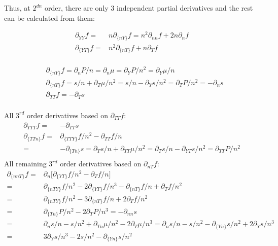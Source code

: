 \documentclass[11pt,letter]{article}
\begin{document}
Thus, at $2^{dn}$ order, there are only 3 independent partial derivatives and the rest can be calculated from them:
\begin{mdframed}
\begin{equation}
 \begin{split}
 \partial_{YY}f=&n\partial_{\{nY\}}f=n^2\partial_{nn}f+2n\partial_n f\\
  \partial_{\{YT\}}f=&n^2\partial_{\{nT\}}f+n\partial_{T}f\\
 \end{split}
\end{equation}
\end{mdframed}
\begin{mdframed}
\begin{equation}
 \begin{split}
  &\partial_{\{nY\}}f= \partial_n P/n = \partial_n \mu  = \partial_Y P /n^2 = \partial_Y \mu /n \\
  &\partial_{\{nT\}}f=s/n+\partial_T\mu/n^2=s/n-\partial_Ys/n^2=\partial_T P/n^2=-\partial_n s\\
  &\partial_{TT} f =-\partial_T s\\
 \end{split}
\end{equation}
\end{mdframed}
All $3^{rd}$ order derivatives based on $\partial_{TT}f$:
\begin{equation}
 \begin{split}
  \partial_{TTT}f=&-\partial_{TT}s\\
  \partial_{\{TTn\}}f=&\partial_{\{TTY\}}f/n^2-\partial_{TT}f/n\\
  =&-\partial_{\{Tn\}}s=\partial_Ts/n+\partial_{TT}\mu/n^2 = \partial_Ts/n-\partial_{YT}s/n^2=\partial_{TT}P/n^2\\ 
 \end{split}
\end{equation}
All remaining $3^{rd}$ order derivatives based on $\partial_{nT}f$:
\begin{equation}
 \begin{split}
  \partial_{\{nnT\}}f=&\partial_n \big[ \partial_{\{YT\}}f/n^2-\partial_{T}f/n\big]\\
  =&\partial_{\{nTY\}}f/n^2-2\partial_{\{YT\}}f/n^3-\partial_{\{nT\}}f/n+\partial_{T}f/n^2\\
  =&\partial_{\{nTY\}}f/n^2-3\partial_{\{nT\}}f/n+2\partial_{T}f/n^2\\
  =&\partial_{\{Tn\}}P/n^2-2\partial_{T}P/n^3=-\partial_{nn}s\\
  =&\partial_{n}s/n-s/n^2+\partial_{Tn}\mu/n^2-2\partial_{T}\mu/n^3=\partial_{n}s/n-s/n^2-\partial_{\{Yn\}}s/n^2+2\partial_{Y}s/n^3\\
  =&3\partial_Ys/n^3-2s/n^2-\partial_{\{Yn\}}s/n^2
 \end{split}
\end{equation}
\end{document}
